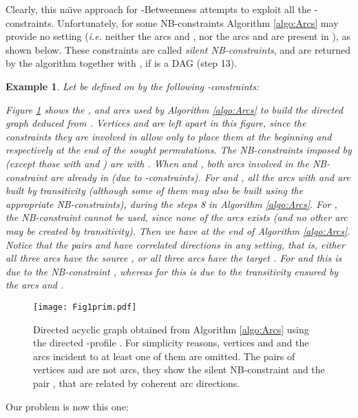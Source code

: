 \documentclass{article}
\newtheorem{ex}{Example}
\newcommand{\bex}{\begin{ex}\rm}
\newcommand{\eex}{\end{ex}}
\begin{document}
\noindent Clearly, this na\"{\i}ve approach for {\sc -Betweenness} attempts to 
exploit all the -constraints. Unfortunately,  for some NB-constraints 
 Algorithm \ref{algo:Arcs} may provide no setting ({\em i.e.} neither the arcs  
and , nor the arcs  and  are present in ), as shown below. 
These constraints are called {\em silent NB-constraints}, and are returned by the algorithm together with , if  is a DAG (step 13).

\bex
Let  be defined on  by the following -constraints:



\noindent Figure \ref{fig:ex} shows the ,  and  arcs used by Algorithm \ref{algo:Arcs} to
build the directed graph deduced from . Vertices  and  are left apart in this figure, since the
constraints they are involved in allow only to place them at the beginning and respectively at
the end of the sought permutations.   The NB-constraints imposed by  (except those with  and )
are  with . When  and , both arcs involved in the NB-constraint are 
already in  (due to -constraints). For  and , all the arcs with  and  are built by
transitivity (although some of them may also be built using the appropriate NB-constraints), during the steps 8 
in Algorithm \ref{algo:Arcs}. For , the NB-constraint cannot be used, since none of the arcs exists
(and no other arc may be created by transitivity). Then we
have  at the end of Algorithm \ref{algo:Arcs}. 
Notice that the pairs  and  have correlated
directions in any setting, that is, either all three arcs have the source ,
or all three arcs have the target . For  and  this is due
to the NB-constraint , whereas for  this is due to the
transitivity ensured by the arcs  and .
\eex


\begin{figure}[t]
\vspace*{-1.5cm}
\begin{center}
\texttt{[image: Fig1prim.pdf]}
\end{center}
\vspace*{-3cm}
\caption{{\small Directed acyclic graph  obtained from Algorithm \ref{algo:Arcs} using the directed
-profile . For simplicity reasons, vertices  and  and the arcs incident
to at least one of them are omitted. The pairs of vertices  and  are not arcs, they
show the silent NB-constraint   and the pair , that are related by 
coherent arc directions.  }}
\label{fig:ex}
\end{figure}


Our problem is now this one:
\end{document}
